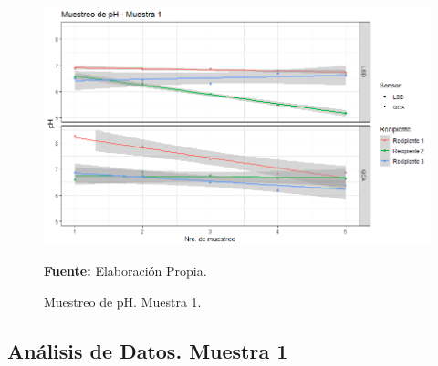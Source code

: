     \begin{figure}[H]
        \centering
        \includegraphics[width=0.7\linewidth]{Imagenes/cap4/pH_M1.png}
        \caption {Muestreo de pH. Muestra 1. }{\textbf{Fuente:}
        Elaboraci\'on Propia. }
        \label{fig:M1PH}
    \end{figure}

\subsection{An\'alisis de Datos. Muestra 1}


